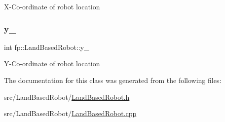 X-\/\+Co-\/ordinate of robot location \mbox{\label{classfp_1_1_land_based_robot_a130cfd6ad383116076dc891ee3a52671}} 
\subsubsection{\texorpdfstring{y\+\_\+}{y\_}}
{\footnotesize\ttfamily int fp\+::\+Land\+Based\+Robot\+::y\+\_\+\hspace{0.3cm}{\ttfamily [protected]}}

Y-\/\+Co-\/ordinate of robot location 

The documentation for this class was generated from the following files\+:\begin{DoxyCompactItemize}
\item 
src/\+Land\+Based\+Robot/\hyperlink{_land_based_robot_8h}{Land\+Based\+Robot.\+h}\item 
src/\+Land\+Based\+Robot/\hyperlink{_land_based_robot_8cpp}{Land\+Based\+Robot.\+cpp}\end{DoxyCompactItemize}
